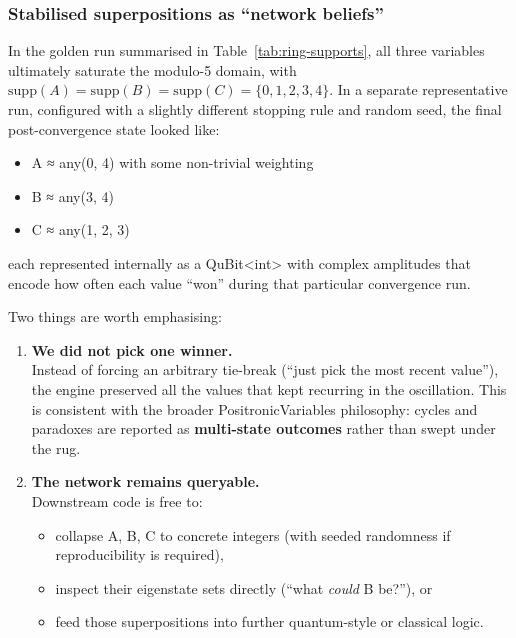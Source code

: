 \documentclass[a4paper,11pt]{article}
\begin{document}
\subsubsection{Stabilised superpositions as ``network beliefs''}

In the golden run summarised in Table~\ref{tab:ring-supports}, all three variables
ultimately saturate the modulo-5 domain, with
$\mathrm{supp}(A) = \mathrm{supp}(B) = \mathrm{supp}(C) = \{0,1,2,3,4\}$.
In a separate representative run, configured with a slightly different stopping rule
and random seed, the final post-convergence state looked like:

\begin{itemize}
\item
  A ≈ any(0, 4) with some non-trivial weighting
\item
  B ≈ any(3, 4)
\item
  C ≈ any(1, 2, 3)
\end{itemize}

each represented internally as a QuBit\textless int\textgreater{} with complex amplitudes
that encode how often each value ``won'' during that particular convergence run.

Two things are worth emphasising:

\begin{enumerate}
\def\labelenumi{\arabic{enumi}.}
\item
  \textbf{We did not pick one winner.}\\
  Instead of forcing an arbitrary tie-break (``just pick the most recent value''), the engine preserved all the values that kept recurring in the oscillation. This is consistent with the broader PositronicVariables philosophy: cycles and paradoxes are reported as \textbf{multi-state outcomes} rather than swept under the rug.
\item
  \textbf{The network remains queryable.}\\
  Downstream code is free to:

  \begin{itemize}
  \item
    collapse A, B, C to concrete integers (with seeded randomness if reproducibility is required),
  \item
    inspect their eigenstate sets directly (``what \emph{could} B be?''), or
  \item
    feed those superpositions into further quantum-style or classical logic.
  \end{itemize}
\end{enumerate}
\end{document}
